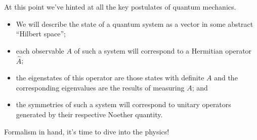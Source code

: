 \documentclass[../p116main.tex]{subfiles}
\begin{document}
At this point we've hinted at all the key postulates of quantum mechanics.
\begin{itemize}[topsep=0pt]
    \item We will describe the state of a quantum system as a vector in some abstract ``Hilbert space'';
    \item each observable $A$ of such a system will correspond to a Hermitian operator $\hat A$;
    \item the eigenstates of this operator are those states with definite $A$ and the corresponding eigenvalues are the results of measuring $A$; and
    \item the symmetries of such a system will correspond to unitary operators generated by their respective Noether quantity.
\end{itemize}
Formalism in hand, it's time to dive into the physics!
\end{document}
